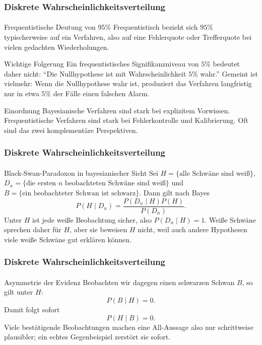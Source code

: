\documentclass{beamer}
\begin{document}
\begin{frame}
    \frametitle{Diskrete Wahrscheinlichkeitsverteilung}
\framesubtitle{}

\begin{block}{Frequentistische Deutung von $95\%$}
Frequentistisch bezieht sich $95\%$ typischerweise auf ein Verfahren, also auf eine Fehlerquote oder Trefferquote bei vielen gedachten Wiederholungen.
\end{block}

\begin{block}{Wichtige Folgerung}
Ein frequentistisches Signifikanzniveau von $5\%$ bedeutet daher nicht:
``Die Nullhypothese ist mit Wahrscheinlichkeit $5\%$ wahr.''
Gemeint ist vielmehr: Wenn die Nullhypothese wahr ist, produziert das Verfahren langfristig nur in etwa $5\%$ der Fälle einen falschen Alarm.
\end{block}

\begin{block}{Einordnung}
Bayesianische Verfahren sind stark bei explizitem Vorwissen.
Frequentistische Verfahren sind stark bei Fehlerkontrolle und Kalibrierung.
Oft sind das zwei komplementäre Perspektiven.
\end{block}

 \end{frame}


\begin{frame}
    \frametitle{Diskrete Wahrscheinlichkeitsverteilung}
\framesubtitle{}

\begin{block}{Black-Swan-Paradoxon in bayesianischer Sicht}
Sei \(H=\{\text{alle Schwäne sind weiß}\}\),
\(D_n=\{\text{die ersten } n \text{ beobachteten Schwäne sind weiß}\}\)
und \(B=\{\text{ein beobachteter Schwan ist schwarz}\}\).
Dann gilt nach Bayes
\[
P(H \mid D_n)=\frac{P(D_n \mid H)P(H)}{P(D_n)}.
\]
Unter \(H\) ist jede weiße Beobachtung sicher, also \(P(D_n \mid H)=1\).
Weiße Schwäne sprechen daher für \(H\), aber sie beweisen \(H\) nicht, weil auch andere Hypothesen viele weiße Schwäne gut erklären können.
\end{block}

 \end{frame}


\begin{frame}
    \frametitle{Diskrete Wahrscheinlichkeitsverteilung}
\framesubtitle{}

\begin{block}{Asymmetrie der Evidenz}
Beobachten wir dagegen einen schwarzen Schwan \(B\), so gilt unter \(H\):
\[
P(B \mid H)=0.
\]
Damit folgt sofort
\[
P(H \mid B)=0.
\]
Viele bestätigende Beobachtungen machen eine All-Aussage also nur schrittweise plausibler; ein echtes Gegenbeispiel zerstört sie sofort.
\end{block}

 \end{frame}
\end{document}
